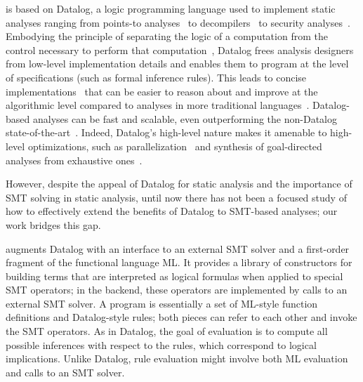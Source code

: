 \documentclass[acmsmall,screen,nonacm]{acmart}
\theoremstyle{definition}
\begin{document}
\Name is based on Datalog, a logic programming language used to implement
static analyses ranging from points-to analyses~\citep{bddbddbPointer,doop} to
decompilers~\citep{gigahorse,datalogdisassembly} to security
analyses~\citep{bddbddbSecurity,souffle1,gatekeeper,madmax,securify}.
Embodying the principle of separating the logic of a computation from the
control necessary to perform that computation~\citep{kowalski}, Datalog frees
analysis designers from low-level implementation details and enables them to
program at the level of specifications (such as formal inference rules).
This leads to concise implementations~\citep{bddbddbUsing} that can be easier
to reason about and improve at the algorithmic level compared to
analyses in more traditional languages~\citep{fastandeasy}.
Datalog-based analyses can be fast and scalable, even outperforming the
non-Datalog state-of-the-art~\citep{doop}.
Indeed, Datalog's high-level nature makes it amenable to high-level
optimizations, such as parallelization~\citep{souffle2} and synthesis of
goal-directed analyses from exhaustive ones~\citep{reps}.

However, despite the appeal of Datalog for static analysis and the importance
of SMT solving in static analysis, until now there has not been a focused study
of how to effectively extend the benefits of Datalog to SMT-based analyses;
our work bridges this gap.

\smallskip

\Name augments Datalog with an interface to an external SMT solver and a
first-order fragment of the functional language ML.
It provides a library of constructors for building terms that are interpreted
as logical formulas when applied to special SMT operators; in the backend,
these operators are implemented by calls to an external SMT solver.
A \Name program is essentially a set of ML-style function definitions and
Datalog-style rules; both pieces can refer to each other and invoke the SMT
operators.
As in Datalog, the goal of \Name evaluation is to compute all possible
inferences with respect to the rules, which correspond to logical implications.
Unlike Datalog, rule evaluation might involve both ML evaluation and calls to
an SMT solver.
\end{document}
